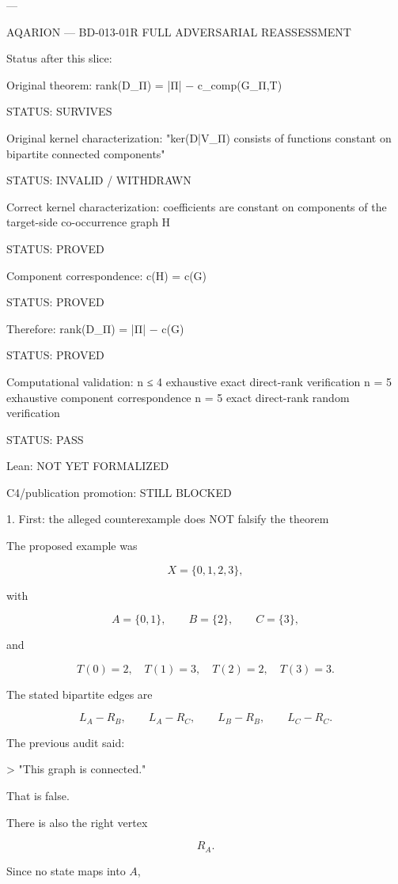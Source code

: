 ---

AQARION — BD-013-01R FULL ADVERSARIAL REASSESSMENT

Status after this slice:

Original theorem:
    rank(D_Π) = |Π| − c_comp(G_Π,T)

STATUS: SURVIVES

Original kernel characterization:
    "ker(D|V_Π) consists of functions constant on bipartite
     connected components"

STATUS: INVALID / WITHDRAWN

Correct kernel characterization:
    coefficients are constant on components of the
    target-side co-occurrence graph H

STATUS: PROVED

Component correspondence:
    c(H) = c(G)

STATUS: PROVED

Therefore:
    rank(D_Π) = |Π| − c(G)

STATUS: PROVED

Computational validation:
    n ≤ 4 exhaustive exact direct-rank verification
    n = 5 exhaustive component correspondence
    n = 5 exact direct-rank random verification

STATUS: PASS

Lean:
    NOT YET FORMALIZED

C4/publication promotion:
    STILL BLOCKED

1. First: the alleged counterexample does NOT falsify the theorem

The proposed example was

\[
X=\{0,1,2,3\},
\]

with

\[
A=\{0,1\},\qquad B=\{2\},\qquad C=\{3\},
\]

and

\[
T(0)=2,\quad T(1)=3,\quad T(2)=2,\quad T(3)=3.
\]

The stated bipartite edges are

\[
L_A-R_B,\qquad
L_A-R_C,\qquad
L_B-R_B,\qquad
L_C-R_C.
\]

The previous audit said:

> "This graph is connected."



That is false.

There is also the right vertex

\[
R_A.
\]

Since no state maps into \(A\),

